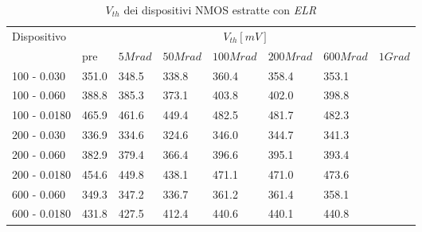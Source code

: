 \documentclass[12pt, letterpaper]{book}
\begin{document}
\begin{table}[H]
  \renewcommand{\arraystretch}{1.3}
  \begin{tabular}{m{2.1cm} m{0.8cm} m{1.1cm} m{1.3cm} m{1.5cm} m{1.5cm} m{1.5cm} m{1cm}}
    \toprule
    \multirow{2}{*}{Dispositivo} & \multicolumn{7}{c}{$V_{th} [mV] $}                                                                    \\
    \cmidrule{2-8}
                                 & pre                                & $5Mrad$ & $50Mrad$ & $100Mrad$ & $200Mrad$ & $600Mrad$ & $1Grad$ \\
    \midrule
    100 - 0.030                     & 351.0                              & 348.5   & 338.8    & 360.4     & 358.4     & 353.1     &         \\
    \hline
    100 - 0.060                     & 388.8                              & 385.3   & 373.1    & 403.8     & 402.0     & 398.8     &         \\
    \hline
    100 - 0.0180                    & 465.9                              & 461.6   & 449.4    & 482.5     & 481.7     & 482.3     &         \\
    \hline
    200 - 0.030                     & 336.9                              & 334.6   & 324.6    & 346.0     & 344.7     & 341.3     &         \\
    \hline
    200 - 0.060                     & 382.9                              & 379.4   & 366.4    & 396.6     & 395.1     & 393.4     &         \\
    \hline
    200 - 0.0180                    & 454.6                              & 449.8   & 438.1    & 471.1     & 471.0     & 473.6     &         \\
    \hline
    600 - 0.060                     & 349.3                              & 347.2   & 336.7    & 361.2     & 361.4     & 358.1     &         \\
    \hline
    600 - 0.0180                    & 431.8                              & 427.5   & 412.4    & 440.6     & 440.1     & 440.8     &         \\
    \bottomrule
  \end{tabular}
  \caption{$V_{th}$ dei dispositivi NMOS estratte con \emph{ELR}}
  \label{tab:VthELRN}
\end{table}
\end{document}
